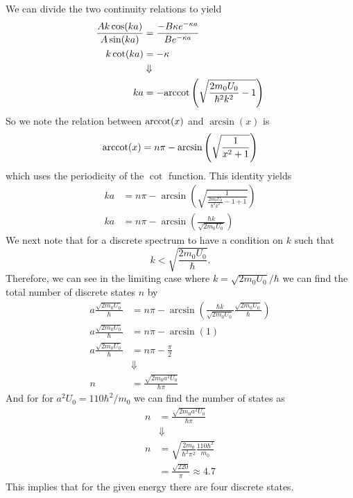 \documentclass[11pt]{article}
\numberwithin{equation}{section}
\begin{document}
We can divide the two continuity relations to yield
\begin{align*}
\frac{Ak\cos(ka)}{A\sin(ka)} &= \frac{-B\kappa e^{-\kappa{a}}}{Be^{-\kappa{a}}}\\
k\cot(ka) &= -\kappa\\
&\Downarrow\\
ka &= -\textnormal{arccot}\left(\sqrt{\frac{2m_0U_0}{\hbar^2k^2}-1}\right)
\end{align*}
So we note the relation between $\textnormal{arccot}(x)$ and $\arcsin(x)$ is
$$\textnormal{arccot}(x) = n\pi - \arcsin\left(\sqrt{\frac{1}{x^2+1}}\right)$$
which uses the periodicity of the $\cot$ function. This identity yields
\begin{align*}
ka &= n\pi-\arcsin\left(\sqrt{\frac{1}{\frac{2m_0U_0}{\hbar^2k^2}-1+1}}\right)\\
ka &= n\pi-\arcsin\left(\frac{\hbar{k}}{\sqrt{2m_0U_0}}\right)
\end{align*}
We next note that for a discrete spectrum to have a condition on $k$ such that
$$k<\sqrt{\frac{2m_0{U_0}}{\hbar}}.$$
Therefore, we can see in the limiting case where $k=\sqrt{2m_0U_0}/\hbar$ we can find the 
total number of discrete states $n$ by
\begin{align*}
a\frac{\sqrt{2m_0U_0}}{\hbar} &= n\pi-\arcsin\left(\frac{\hbar{k}}{\sqrt{2m_0U_0}}\frac{\sqrt{2m_0U_0}}{\hbar}\right)\\
a\frac{\sqrt{2m_0U_0}}{\hbar} &= n\pi-\arcsin(1)\\
a\frac{\sqrt{2m_0U_0}}{\hbar} &= n\pi-\frac{\pi}{2}\\
&\Downarrow\\
n &= \frac{\sqrt{2m_0a^2U_0}}{\hbar\pi}
\end{align*}
And for for $a^2U_0=110\hbar^2/m_0$ we can find the number of states as
\begin{align*}
n &= \frac{\sqrt{2m_0a^2U_0}}{\hbar\pi}\\
&\Downarrow\\
n &= \sqrt{\frac{2m_0}{\hbar^2\pi^2}\frac{110\hbar^2}{m_0}}\\
&= \frac{\sqrt{220}}{\pi}\approx 4.7
\end{align*}
This implies that for the given energy there are four discrete states.

\pagebreak
\end{document}
